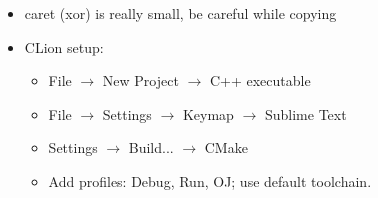 \begin{itemize}
  \itemsep -.3em
  \item caret (xor) is really small, be careful while copying
  \item CLion setup:
  \begin{itemize}
    \itemsep -.3em
    \item File $\rightarrow$ New Project $\rightarrow$ C++ executable
    \item File $\rightarrow$ Settings $\rightarrow$ Keymap $\rightarrow$ Sublime Text
    \item Settings $\rightarrow$ Build... $\rightarrow$ CMake
    \item Add profiles: Debug, Run, OJ; use default toolchain.
  \end{itemize}
\end{itemize}